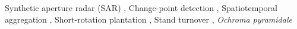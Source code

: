 \documentclass[a4paper,fleqn]{cas-sc}
\begin{document}
\begin{keywords}
  Synthetic aperture radar (SAR) \sep
  Change-point detection \sep
  Spatiotemporal aggregation \sep
  Short-rotation plantation \sep
  Stand turnover \sep
  \textit{Ochroma pyramidale}
\end{keywords}

\maketitle
\doublespacing









\printcredits


\end{document}
